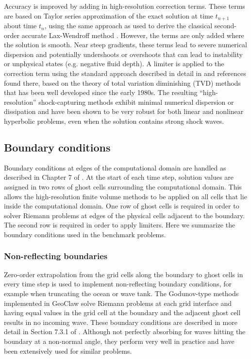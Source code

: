Accuracy is improved by adding in high-resolution correction terms.  These
terms are based on Taylor series approximation of the exact solution at time
$t_{n+1}$ about time $t_n$, using the same approach as used to derive the
classical second-order accurate Lax-Wendroff  method \cite{rjl:fdm}.
However, the terms are only added where the solution is smooth.  Near steep
gradients, these terms lead to severe numerical dispersion and potentially
undershoots or overshoots that can lead to instability or unphysical states
(e.g. negative fluid depth).  A limiter is applied to the correction term
using the standard approach described in detail in 
\cite{rjl:fvmhp} and references found there, based on the theory of total
variation diminishing (TVD) methods that has been well developed since the
early 1980s.  The resulting ``high-resolution'' shock-capturing 
methods exhibit minimal numerical dispersion or dissipation and have been
shown to be very robust for both linear and nonlinear hyperbolic problems, 
even when the solution contains strong shock waves.

\subsection{Boundary conditions}\label{sec:bc}
Boundary conditions at edges of the computational domain are handled as
described in Chapter 7 of \cite{rjl:fvmhp}.
At the start of each time step, solution values are assigned in two
rows of ghost cells surrounding the computational domain.  This allows
the high-resolution finite volume methods to be applied on all cells
that lie inside the computational domain.  One row of ghost cells is
required in order to solver Riemann problems at edges of the physical
cells adjacent to the boundary.  The second row is required in order
to apply limiters.
Here we summarize the boundary conditions used in the benchmark
problems.  

\subsubsection{Non-reflecting boundaries}\label{sec:bc-outflow}
Zero-order extrapolation from the grid cells along the boundary to ghost
cells in every time step is used to implement non-reflecting boundary
conditions, for example when truncating the ocean or wave tank.  The
Godunov-type methods implemented in GeoClaw solve Riemann problems at each
grid interface and having equal values in the grid cell at the boundary and
the adjacent ghost cell results in no incoming wave.  These boundary
conditions are described in more detail in
Section 7.3.1 of \cite{rjl:fvmhp}.  Although not perfectly absorbing
for waves hitting the boundary at a non-normal angle, they perform
very well in practice and have been extensively used for similar
problems.

